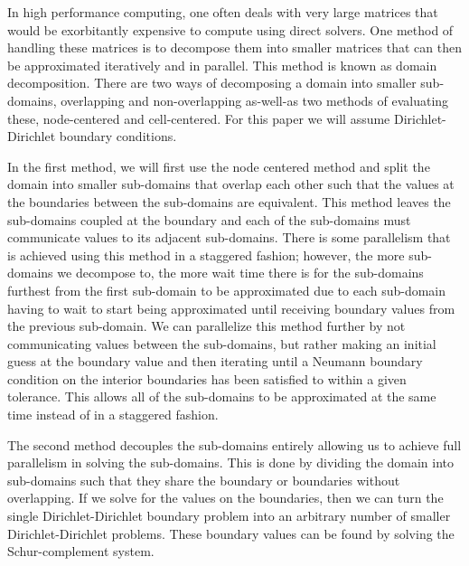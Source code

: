 In high performance computing, one often deals with very large matrices that would be exorbitantly expensive to compute using direct solvers. One method of handling these matrices is to decompose them into smaller matrices that can then be approximated iteratively and in parallel. This method is known as domain decomposition. There are two ways of decomposing a domain into smaller sub-domains, overlapping and non-overlapping as-well-as two methods of evaluating these, node-centered and cell-centered. For this paper we will assume Dirichlet-Dirichlet boundary conditions.

In the first method, we will first use the node centered method and split the domain into smaller sub-domains that overlap each other such that the values at the boundaries between the sub-domains are equivalent. This method leaves the sub-domains coupled at the boundary and each of the sub-domains must communicate values to its adjacent sub-domains. There is some parallelism that is achieved using this method in a staggered fashion; however, the more sub-domains we decompose to, the more wait time there is for the sub-domains furthest from the first sub-domain to be approximated due to each sub-domain having to wait to start being approximated until receiving boundary values from the previous sub-domain. We can parallelize this method further by not communicating values between the sub-domains, but rather making an initial guess at the boundary value and then iterating until a Neumann boundary condition on the interior boundaries has been satisfied to within a given tolerance. This allows all of the sub-domains to be approximated at the same time instead of in a staggered fashion.

The second method decouples the sub-domains entirely allowing us to achieve full parallelism in solving the sub-domains. This is done by dividing the domain into sub-domains such that they share the boundary or boundaries without overlapping. If we solve for the values on the boundaries, then we can turn the single Dirichlet-Dirichlet boundary problem into an arbitrary number of smaller Dirichlet-Dirichlet problems. These boundary values can be found by solving the Schur-complement system.